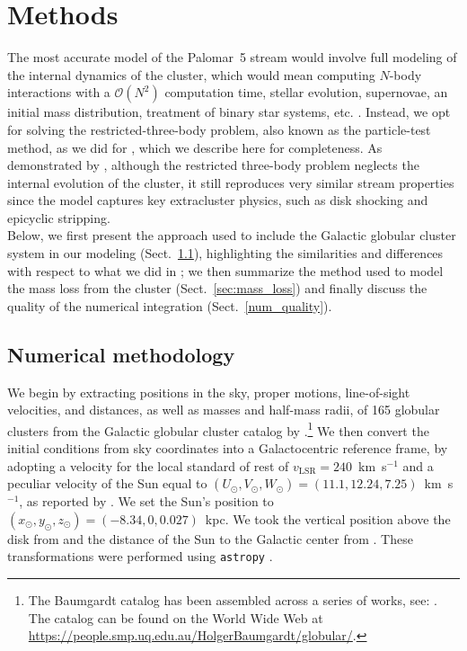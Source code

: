\documentclass{aa}
\begin{document}
\section{Methods}
  The most accurate model of the Palomar~5 stream would involve full modeling of the internal dynamics of the cluster, which would mean computing $N$-body interactions with a $\mathcal{O}(N^2)$ computation time, stellar evolution, supernovae, an initial mass distribution, treatment of binary star systems, etc. \citep[for such an example, see][]{2021NatAs...5..957G, 2016MNRAS.458.1450W}. Instead, we opt for solving the restricted-three-body problem, also known as the particle-test method, as we did for \citet{2023A&A...673A..44F}, which we describe here for completeness. As demonstrated by \citet{2012A&A...546L...7M}, although the restricted three-body problem neglects the internal evolution of the cluster, it still reproduces very similar stream properties since the model captures key extracluster physics, such as disk shocking and epicyclic stripping.\\
  Below, we first present the approach used to include the Galactic globular cluster system in our modeling (Sect.~\ref{numerical_meth}), highlighting the similarities and differences with respect to what we did in \citet{2023A&A...673A..44F}; we then summarize the method used to model the mass loss from the cluster (Sect.~\ref{sec:mass_loss}) and finally discuss the quality of the numerical integration (Sect.~\ref{num_quality}). 

  \subsection{Numerical methodology}\label{numerical_meth}
    We begin by extracting positions in the sky, proper motions, line-of-sight velocities, and distances, as well as masses and half-mass radii, of 165 globular clusters from the Galactic globular cluster catalog by \cite{2021MNRAS.505.5957B}.\footnote{The Baumgardt catalog has been assembled across a series of works, see: \cite{2020PASA...37...46B,2019MNRAS.482.5138B,2018MNRAS.478.1520B}. The catalog can be found on the World Wide Web at \href{https://people.smp.uq.edu.au/HolgerBaumgardt/globular/}{https://people.smp.uq.edu.au/HolgerBaumgardt/globular/}.} We then convert the initial conditions from sky coordinates into a Galactocentric reference frame, by adopting a velocity for the local standard of rest of $v_{\text{LSR}} = 240$~km~s$^{-1}$ and a peculiar velocity of the Sun equal to $(U_\odot, V_\odot, W_\odot)=(11.1, 12.24, 7.25)$~km~s$^{-1}$, as reported by \citet{2012MNRAS.427..274S}.  We set the Sun's position to $(x_\odot,y_\odot,z_\odot) = (-8.34,0,0.027)$~kpc. We took the vertical position above the disk from \citet{2001ApJ...553..184C} and the distance of the Sun to the Galactic center from \citet{2014ApJ...783..130R}. These transformations were performed using \texttt{astropy} \citep{2013A&A...558A..33A}.
\end{document}
